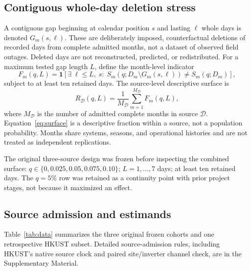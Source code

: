 \documentclass[preprint,12pt]{elsarticle}
\begin{document}
\subsection{Contiguous whole-day deletion stress}
A contiguous gap beginning at calendar position $s$ and lasting $\ell$ whole days is denoted $G_m(s,\ell)$. These are deliberately imposed, counterfactual deletions of recorded days from complete admitted months, not a dataset of observed field outages. Deleted days are not reconstructed, predicted, or redistributed. For a maximum tested gap length $L$, define the month-level indicator
\begin{equation}
F_m(q,L)=\mathbf{1}\left[\exists\;\ell\leq L,\;s:\;S_m(q;D_m\setminus G_m(s,\ell))\neq S_m(q;D_m)\right],
\label{eq:fragile}
\end{equation}
subject to at least ten retained days. The source-level descriptive surface is
\begin{equation}
R_{\mathcal{D}}(q,L)=\frac{1}{M_{\mathcal{D}}}\sum_{m=1}^{M_{\mathcal{D}}}F_m(q,L),
\label{eq:surface}
\end{equation}
where $M_{\mathcal{D}}$ is the number of admitted complete months in source $\mathcal{D}$. Equation~\eqref{eq:surface} is a descriptive fraction within a source, not a population probability. Months share systems, seasons, and operational histories and are not treated as independent replications.

The original three-source design was frozen before inspecting the combined surface: $q\in\{0,0.025,0.05,0.075,0.10\}$; $L=1,\ldots,7$ days; at least ten retained days. The $q=5\%$ row was retained as a continuity point with prior project stages, not because it maximized an effect.

\subsection{Source admission and estimands}
Table~\ref{tab:data} summarizes the three original frozen cohorts and one retrospective HKUST subset. Detailed source-admission rules, including HKUST's native source clock and paired site/inverter channel check, are in the Supplementary Material.
\end{document}
